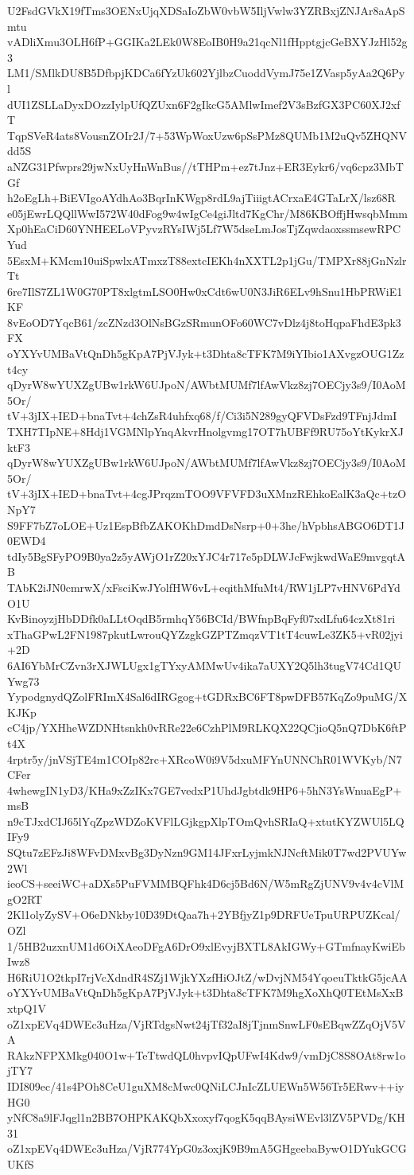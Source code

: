U2FsdGVkX19fTms3OENxUjqXDSaIoZbW0vbW5IljVwlw3YZRBxjZNJAr8aApSmtu
vADliXmu3OLH6fP+GGIKa2LEk0W8EoIB0H9a21qcNl1fHpptgjcGeBXYJzHl52g3
LM1/SMlkDU8B5DfbpjKDCa6fYzUk602YjlbzCuoddVymJ75e1ZVasp5yAa2Q6Pyl
dUI1ZSLLaDyxDOzzIylpUfQZUxn6F2gIkcG5AMlwImef2V3sBzfGX3PC60XJ2xfT
TqpSVeR4ats8VousnZOIr2J/7+53WpWoxUzw6pSsPMz8QUMb1M2uQv5ZHQNVdd5S
aNZG31Pfwprs29jwNxUyHnWnBus//tTHPm+ez7tJnz+ER3Eykr6/vq6cpz3MbTGf
h2oEgLh+BiEVIgoAYdhAo3BqrInKWgp8rdL9ajTiiigtACrxaE4GTaLrX/lsz68R
e05jEwrLQQllWwI572W40dFog9w4wIgCe4giJltd7KgChr/M86KBOffjHwsqbMmm
Xp0hEaCiD60YNHEELoVPyvzRYsIWj5Lf7W5dseLmJosTjZqwdaoxssmsewRPCYud
5EsxM+KMcm10uiSpwlxATmxzT88extcIEKh4nXXTL2p1jGu/TMPXr88jGnNzlrTt
6re7IlS7ZL1W0G70PT8xlgtmLSO0Hw0xCdt6wU0N3JiR6ELv9hSnu1HbPRWiE1KF
8vEoOD7YqcB61/zcZNzd3OlNsBGzSRmunOFo60WC7vDlz4j8toHqpaFhdE3pk3FX
oYXYvUMBaVtQnDh5gKpA7PjVJyk+t3Dhta8cTFK7M9iYIbio1AXvgzOUG1Zzt4cy
qDyrW8wYUXZgUBw1rkW6UJpoN/AWbtMUMf7lfAwVkz8zj7OECjy3s9/I0AoM5Or/
tV+3jIX+IED+bnaTvt+4chZsR4uhfxq68/f/Ci3i5N289gyQFVDsFzd9TFnjJdmI
TXH7TIpNE+8Hdj1VGMNlpYnqAkvrHnolgvmg17OT7hUBFf9RU75oYtKykrXJktF3
qDyrW8wYUXZgUBw1rkW6UJpoN/AWbtMUMf7lfAwVkz8zj7OECjy3s9/I0AoM5Or/
tV+3jIX+IED+bnaTvt+4cgJPrqzmTOO9VFVFD3uXMnzREhkoEalK3aQc+tzONpY7
S9FF7bZ7oLOE+Uz1EspBfbZAKOKhDmdDsNsrp+0+3he/hVpbhsABGO6DT1J0EWD4
tdIy5BgSFyPO9B0ya2z5yAWjO1rZ20xYJC4r717e5pDLWJcFwjkwdWaE9mvgqtAB
TAbK2iJN0cmrwX/xFsciKwJYolfHW6vL+eqithMfuMt4/RW1jLP7vHNV6PdYdO1U
KvBinoyzjHbDDfk0aLLtOqdB5rmhqY56BCId/BWfnpBqFyf07xdLfu64czXt81ri
xThaGPwL2FN1987pkutLwrouQYZzgkGZPTZmqzVT1tT4cuwLe3ZK5+vR02jyi+2D
6AI6YbMrCZvn3rXJWLUgx1gTYxyAMMwUv4ika7aUXY2Q5lh3tugV74Cd1QUYwg73
YypodgnydQZolFRImX4Sal6dIRGgog+tGDRxBC6FT8pwDFB57KqZo9puMG/XKJKp
cC4jp/YXHheWZDNHtsnkh0vRRe22e6CzhPlM9RLKQX22QCjioQ5nQ7DbK6ftPt4X
4rptr5y/jnVSjTE4m1COIp82rc+XRcoW0i9V5dxuMFYnUNNChR01WVKyb/N7CFer
4whewgIN1yD3/KHa9xZzIKx7GE7vedxP1UhdJgbtdk9HP6+5hN3YsWnuaEgP+msB
n9cTJxdCIJ65lYqZpzWDZoKVFlLGjkgpXlpTOmQvhSRIaQ+xtutKYZWUl5LQIFy9
SQtu7zEFzJi8WFvDMxvBg3DyNzn9GM14JFxrLyjmkNJNcftMik0T7wd2PVUYw2Wl
ieoCS+seeiWC+aDXs5PuFVMMBQFhk4D6cj5Bd6N/W5mRgZjUNV9v4v4cVlMgO2RT
2Kl1olyZySV+O6eDNkby10D39DtQaa7h+2YBfjyZ1p9DRFUeTpuURPUZKcal/OZl
1/5HB2uzxnUM1d6OiXAeoDFgA6DrO9xlEvyjBXTL8AkIGWy+GTmfnayKwiEbIwz8
H6RiU1O2tkpI7rjVcXdndR4SZj1WjkYXzfHiOJtZ/wDvjNM54YqoeuTktkG5jcAA
oYXYvUMBaVtQnDh5gKpA7PjVJyk+t3Dhta8cTFK7M9hgXoXhQ0TEtMsXxBxtpQ1V
oZ1xpEVq4DWEc3uHza/VjRTdgsNwt24jTf32aI8jTjnmSnwLF0sEBqwZZqOjV5VA
RAkzNFPXMkg040O1w+TeTtwdQL0hvpvIQpUFwI4Kdw9/vmDjC8S8OAt8rw1ojTY7
IDI809ec/41s4POh8CeU1guXM8cMwc0QNiLCJnIcZLUEWn5W56Tr5ERwv++iyHG0
yNfC8a9lFJqgl1n2BB7OHPKAKQbXxoxyf7qogK5qqBAysiWEvl3lZV5PVDg/KH31
oZ1xpEVq4DWEc3uHza/VjR774YpG0z3oxjK9B9mA5GHgeebaBywO1DYukGCGUKfS
